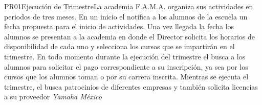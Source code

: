 

\begin{Proceso}{PR01}{Ejecución de Trimestre}{La academia F.A.M.A. organiza sus actividades en periodos de tres meses. En un inicio el  notifica a los alumnos de la escuela un fecha propuesta para el inicio de actividades. Una vez llegada la fecha los alumnos se presentan a la academia en donde el Director solicita los horarios de disponibilidad de cada uno y selecciona los cursos que se impartirán en el trimestre. En todo momento durante la ejecución del trimestre el  busca a los alumnos para solicitar el pago correspondiente a su inscripción, ya sea por los cursos que los alumnos toman o por su carrera inscrita. Mientras se ejecuta el trimestre, el  busca patrocinios de diferentes empresas y también solicita licencias a su proveedor \textit{Yamaha México} }{}
	

\end{Proceso}


